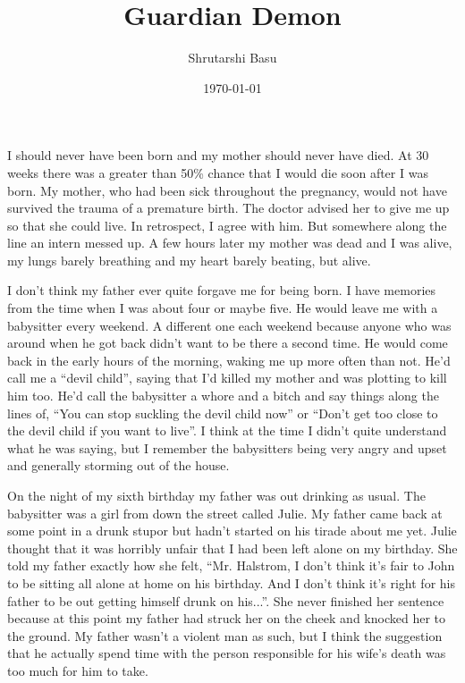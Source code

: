 \documentclass[12pt,letterpaper]{article}
\title{Guardian Demon}
\author{Shrutarshi Basu}
\date{\today}
\begin{document}
\maketitle
\doublespacing

I should never have been born and my mother should never have died. At 30 weeks there was a greater than 50\% chance that I would die soon after I was born. My mother, who had been sick throughout the pregnancy, would not have survived the trauma of a premature birth. The doctor advised her to give me up so that she could live. In retrospect, I agree with him. But somewhere along the line an intern messed up. A few hours later my mother was dead and I was alive, my lungs barely breathing and my heart barely beating, but alive.

\vspace{.75in}

I don't think my father ever quite forgave me for being born. I have memories from the time when I was about four or maybe five. He would leave me with a babysitter every weekend. A different one each weekend because anyone who was around when he got back didn't want to be there a second time. He would come back in the early hours of the morning, waking me up more often than not. He'd call me a ``devil child'', saying that I'd killed my mother and was plotting to kill him too. He'd call the babysitter a whore and a bitch and say things along the lines of, ``You can stop suckling the devil child now'' or ``Don't get too close to the devil child if you want to live''. I think at the time I didn't quite understand what he was saying, but I remember the babysitters being very angry and upset and generally storming out of the house.

On the night of my sixth birthday my father was out drinking as usual. The babysitter was a girl from down the street called Julie. My father came back at some point in a drunk stupor but hadn't started on his tirade about me yet. Julie thought that it was horribly unfair that I had been left alone on my birthday. She told my father exactly how she felt, ``Mr. Halstrom, I don't think it's fair to John to be sitting all alone at home on his birthday. And I don't think it's right for his father to be out getting himself drunk on his...''. She never finished her sentence because at this point my father had struck her on the cheek and knocked her to the ground. My father wasn't a violent man as such, but I think the suggestion that he actually spend time with the person responsible for his wife's death was too much for him to take.
\end{document}
